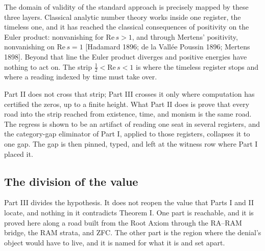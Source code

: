 \documentclass[10pt,twocolumn]{article}
\begin{document}
The domain of validity of the standard approach is precisely mapped by
these three layers. Classical analytic number theory works inside one
register, the timeless one, and it has reached the classical
consequences of positivity on the Euler product: nonvanishing for
\(\mathrm{Re}\, s > 1\), and through Mertens' positivity, nonvanishing
on \(\mathrm{Re}\, s = 1\) {[}Hadamard 1896; de la Vallée Poussin 1896;
Mertens 1898{]}. Beyond that line the Euler product diverges and
positive energies have nothing to act on. The strip
\(\tfrac12 < \mathrm{Re}\, s < 1\) is where the timeless register stops
and where a reading indexed by time must take over.

Part II does not cross that strip; Part III crosses it only where
computation has certified the zeros, up to a finite height. What Part II
does is prove that every road into the strip reached from existence,
time, and monism is the same road. The regress is shown to be an
artifact of reading one seat in several registers, and the category-gap
eliminator of Part I, applied to those registers, collapses it to one
gap. The gap is then pinned, typed, and left at the witness row where
Part I placed it.

\hypertarget{the-division-of-the-value}{%
\subsection{The division of the value}\label{the-division-of-the-value}}

Part III divides the hypothesis. It does not reopen the value that Parts
I and II locate, and nothing in it contradicts Theorem I. One part is
reachable, and it is proved here along a road built from the Root Axiom
through the RA--RAM bridge, the RAM strata, and ZFC. The other part is
the region where the denial's object would have to live, and it is named
for what it is and set apart.
\end{document}

